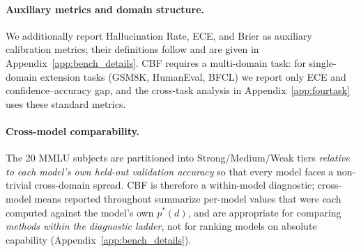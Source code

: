 \documentclass[11pt]{article}
\begin{document}
\paragraph{Auxiliary metrics and domain structure.} We additionally report Hallucination Rate, ECE, and Brier as auxiliary calibration metrics; their definitions follow \citet{guo2017calibration} and are given in Appendix~\ref{app:bench_details}. CBF requires a multi-domain task: for single-domain extension tasks (GSM8K, HumanEval, BFCL) we report only ECE and confidence--accuracy gap, and the cross-task analysis in Appendix~\ref{app:fourtask} uses these standard metrics.

\paragraph{Cross-model comparability.} The 20 MMLU subjects are partitioned into Strong/Medium/Weak tiers \emph{relative to each model's own held-out validation accuracy} so that every model faces a non-trivial cross-domain spread. CBF is therefore a within-model diagnostic; cross-model means reported throughout summarize per-model values that were each computed against the model's own $p^*(d)$, and are appropriate for comparing \emph{methods within the diagnostic ladder}, not for ranking models on absolute capability (Appendix~\ref{app:bench_details}).
\end{document}
